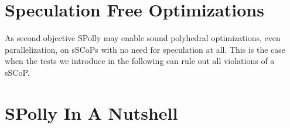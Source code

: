 \section{Speculation Free Optimizations}
\label{SpeculationFreesSCoPs}
As second objective SPolly may enable sound polyhedral optimizations, even
parallelization, on sSCoPs with no need for speculation at all. This is the case
when the tests we introduce in the following can rule out all violations of a
sSCoP. 





\section{SPolly In A Nutshell}

